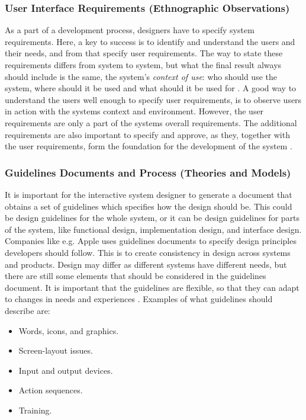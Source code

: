 \subsubsection{User Interface Requirements (Ethnographic Observations)}   
As a part of a development process, designers have to specify system requirements. Here, a key to success is to identify and understand the users and their needs, and from that specify user requirements. The way to state these requirements differs from system to system, but what the final result always should include is the same, the system's \emph{context of use}: who should use the system, where should it be used and what should it be used for \cite{mmi}. A good way to understand the users well enough to specify user requirements, is to observe users in action with the systems context and environment. However, the user requirements are only a part of the systems overall requirements. The additional requirements are also important to specify and approve, as they, together with the user requirements, form the foundation for the development of the system \cite{mmi} \cite{systemutviklingDel1}. 

\subsubsection{Guidelines Documents and Process (Theories and Models)}
It is important for the interactive system designer to generate a document that obtains a set of guidelines which specifies how the design should be. This could be design guidelines for the whole system, or it can be design guidelines for parts of the system, like functional design, implementation design, and interface design. Companies like e.g. Apple uses guidelines documents to specify design principles developers should follow. This is to create consistency in design across systems and products. Design may differ as different systems have different needs, but there are still some elements that should be considered in the guidelines document. It is important that the guidelines are flexible, so that they can adapt to changes in needs and experiences \cite{mmi}. Examples of what guidelines should describe are:

\begin{itemize}
\renewcommand{\labelitemi}{$\bullet$}
\item Words, icons, and graphics.
\item Screen-layout issues.
\item Input and output devices.
\item Action sequences.
\item Training.
\end{itemize}

